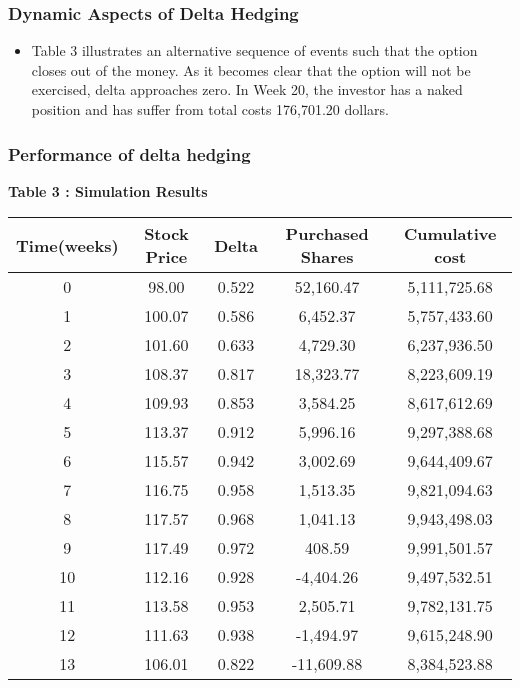\documentclass[cjk]{beamer}
\begin{document}
\begin{CJK*}{UTF8}{gbsn}
\begin{frame}
\end{frame}

\begin{frame}
\frametitle{Dynamic Aspects of Delta Hedging}
\begin{itemize}
\item Table 3 illustrates an alternative sequence of events such that the option closes out of the money. As it becomes clear that the option will not be exercised, delta approaches zero. In Week 20, the investor has a naked position and has suffer from total costs 176,701.20 dollars.
\end{itemize}
\end{frame}

\begin{frame}
\frametitle{Performance of delta hedging}
\caption{\bfseries \color{blue} Table 3 : Simulation Results}
\scriptsize
\begin{tabular}{c c c c c }
\toprule
\hline
\textbf{Time(weeks)} & \textbf{Stock Price} & \textbf{Delta}  & \textbf{Purchased Shares} & \textbf{Cumulative cost}\\
\midrule
\hline
0	 & 98.00 	 & 0.522 	 & 52,160.47 	 & 5,111,725.68   \\
1	 & 100.07 	 & 0.586 	 & 6,452.37 	 & 5,757,433.60   \\
2	 & 101.60 	 & 0.633 	 & 4,729.30 	 & 6,237,936.50   \\
3	 & 108.37 	 & 0.817 	 & 18,323.77 	 & 8,223,609.19   \\
4	 & 109.93 	 & 0.853 	 & 3,584.25 	 & 8,617,612.69   \\
5	 & 113.37 	 & 0.912 	 & 5,996.16 	 & 9,297,388.68   \\
6	 & 115.57 	 & 0.942 	 & 3,002.69 	 & 9,644,409.67   \\
7	 & 116.75 	 & 0.958 	 & 1,513.35 	 & 9,821,094.63   \\
8	 & 117.57 	 & 0.968 	 & 1,041.13 	 & 9,943,498.03   \\
9	 & 117.49 	 & 0.972 	 & 408.59 	     & 9,991,501.57   \\
10	 & 112.16 	 & 0.928 	 & -4,404.26 	 & 9,497,532.51   \\
11	 & 113.58 	 & 0.953 	 & 2,505.71 	 & 9,782,131.75   \\
12	 & 111.63 	 & 0.938 	 & -1,494.97 	 & 9,615,248.90   \\
13	 & 106.01 	 & 0.822 	 & -11,609.88 	 & 8,384,523.88   \\

\end{tabular}
\end{frame}
\end{CJK*}
\end{document}
